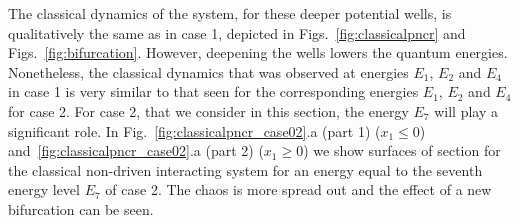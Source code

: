 The classical dynamics of the system, for these deeper potential wells, is qualitatively the same as in case 1, depicted in Figs.~\ref{fig:classicalpncr} and Figs.~\ref{fig:bifurcation}. However, deepening the wells  lowers  the quantum energies.  Nonetheless, the classical dynamics that was observed at energies $E_1$, $E_2$ and $E_4$ in case 1 is very similar to that  seen for the corresponding  energies $E_1$, $E_2$ and $E_4$ for  case 2.  For case 2, that we consider in this section, the energy $E_7$ will play a significant role. In Fig.~\ref{fig:classicalpncr_case02}.a (part 1) ($x_1 \leq 0$) and~\ref{fig:classicalpncr_case02}.a (part 2) ($x_1 \geq 0$) we show surfaces of section for the classical non-driven interacting system  for an energy equal to the seventh energy level $E_7$ of case 2.  The chaos is more spread out and the effect of a  new bifurcation can be seen.

